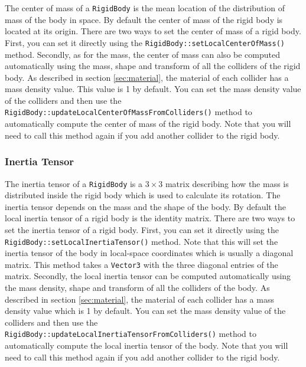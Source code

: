 \documentclass[a4paper,12pt]{article}
\begin{document}
    The center of mass of a \texttt{RigidBody} is the mean location of the distribution of mass of the body in space. By default the center of mass
    of the rigid body is located at its origin. There are two ways to set the center of mass of a rigid body. First, you can set it directly using the
    \texttt{RigidBody::setLocalCenterOfMass()} method. Secondly, as for the mass, the center of mass can also be computed automatically using the
    mass, shape and transform of all the colliders of the rigid body. As described in section \ref{sec:material}, the material of each collider has a
    mass density value. This value is 1 by default. You can set the mass density value of the colliders and then use the
    \texttt{RigidBody::updateLocalCenterOfMassFromColliders()} method to automatically compute the center of mass of the rigid body.
    Note that you will need to call this method again if you add another collider to the rigid body.

    \subsubsection{Inertia Tensor}

    \begin{sloppypar}
    The inertia tensor of a \texttt{RigidBody} is a $3 \times 3$ matrix describing how the mass is distributed inside the rigid body which is
    used to calculate its rotation. The inertia tensor depends on the mass and the shape of the body. By default the local inertia tensor of a rigid body
    is the identity matrix. There are two ways to set the inertia tensor of
    a rigid body. First, you can set it directly using the \texttt{RigidBody::setLocalInertiaTensor()} method. Note that this will set the inertia tensor
    of the body in local-space coordinates which is usually a diagonal matrix. This method takes a \texttt{Vector3} with the three diagonal entries of the
    matrix. Secondly, the local inertia tensor can be computed automatically using the mass density, shape and transform of all the colliders of the body.
    As described in section \ref{sec:material}, the material of each collider has a mass density value which is 1 by default. You can set the mass density
    value of the colliders and then use the \texttt{RigidBody::updateLocalInertiaTensorFromColliders()} method to automatically compute the local inertia
    tensor of the body. Note that you will need to call this method again if you add another collider to the rigid body.
    \end{sloppypar}
\end{document}
